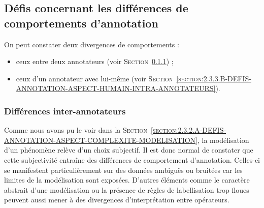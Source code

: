 		
	\subsection{Défis concernant les différences de comportements d'annotation}
	\label{section:2.3.3-DEFIS-ANNOTATION-ASPECT-HUMAIN}
		
		On peut constater deux divergences de comportements :
		\begin{itemize}
			\item ceux entre deux annotateurs (voir \textsc{Section~\ref{section:2.3.3.A-DEFIS-ANNOTATION-ASPECT-HUMAIN-INTER-ANNOTATEURS}}) ;
			\item ceux d'un annotateur avec lui-même (voir \textsc{Section~\ref{section:2.3.3.B-DEFIS-ANNOTATION-ASPECT-HUMAIN-INTRA-ANNOTATEURS}}).
		\end{itemize}
		
		
		\subsubsection{Différences inter-annotateurs}
		\label{section:2.3.3.A-DEFIS-ANNOTATION-ASPECT-HUMAIN-INTER-ANNOTATEURS}
		
			Comme nous avons pu le voir dans la \textsc{Section~\ref{section:2.3.2.A-DEFIS-ANNOTATION-ASPECT-COMPLEXITE-MODELISATION}}, la modélisation d'un phénomène relève d'un choix subjectif.
			Il est donc normal de constater que cette subjectivité entraîne des différences de comportement d'annotation.
			Celles-ci se manifestent particulièrement sur des données ambiguës ou bruitées car les limites de la modélisation sont exposées.
			D'autres éléments comme le caractère abstrait d'une modélisation ou la présence de règles de labellisation trop floues peuvent aussi mener à des divergences d'interprétation entre opérateurs.
			
